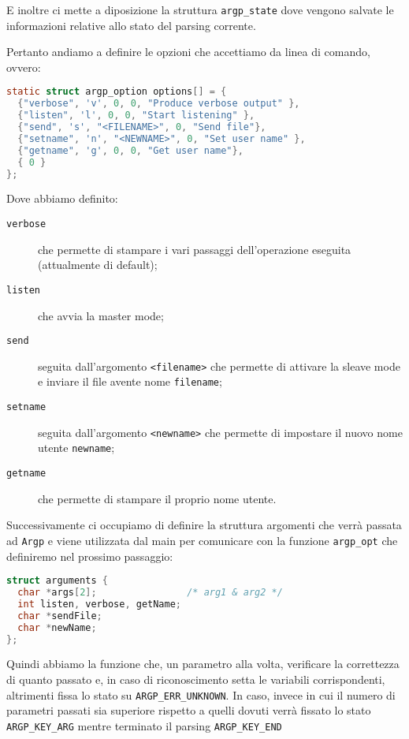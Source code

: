 \documentclass[11pt,fleqn]{book} %
\begin{document}
E inoltre ci mette a diposizione la struttura \texttt{argp\_state} dove vengono salvate le informazioni relative allo stato del parsing corrente.

Pertanto andiamo a definire le opzioni che accettiamo da linea di comando, ovvero:
\begin{lstlisting}[language=C]
	static struct argp_option options[] = {
  {"verbose", 'v', 0, 0, "Produce verbose output" },
  {"listen", 'l', 0, 0, "Start listening" },
  {"send", 's', "<FILENAME>", 0, "Send file"},
  {"setname", 'n', "<NEWNAME>", 0, "Set user name" },
  {"getname", 'g', 0, 0, "Get user name"},
  { 0 }
};
\end{lstlisting}
Dove abbiamo definito:
\begin{description}
	\item [\texttt{verbose}] che permette di stampare i vari passaggi dell'operazione eseguita (attualmente di default);
	\item [\texttt{listen}] che avvia la master mode;
	\item [\texttt{send}]  seguita dall'argomento \texttt{<filename>} che permette di attivare la sleave mode e inviare il file avente nome 					\texttt{filename};
	\item [\texttt{setname}] seguita dall'argomento \texttt{<newname>} che permette di impostare il nuovo nome utente \texttt{newname};
	\item [\texttt{getname}] che permette di stampare il proprio nome utente.
\end{description}

Successivamente ci occupiamo di definire la struttura argomenti che verrà passata ad \texttt{Argp} e viene utilizzata dal main per comunicare con la funzione \texttt{argp\_opt} che definiremo nel prossimo passaggio:
\begin{lstlisting}[language=C]
struct arguments {
  char *args[2];                /* arg1 & arg2 */
  int listen, verbose, getName;
  char *sendFile;
  char *newName;
};
\end{lstlisting}

\noindent Quindi abbiamo la funzione che, un parametro alla volta, verificare la correttezza di quanto passato e, in caso di riconoscimento setta le variabili corrispondenti, altrimenti fissa lo stato su \texttt{ARGP\_ERR\_UNKNOWN}.
In caso, invece in cui il numero di parametri passati sia superiore rispetto a quelli dovuti verrà fissato lo stato \texttt{ARGP\_KEY\_ARG} mentre terminato il parsing \texttt{ARGP\_KEY\_END}
\end{document}
